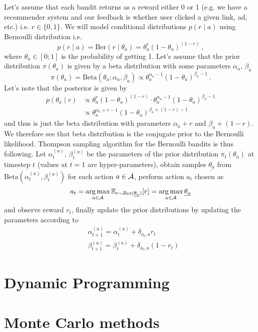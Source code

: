 \documentclass{myclass}
\begin{document}
Let's assume that each bandit returns as a reward either 0 or 1 (e.g. we have a recommender system
and our feedback is whether user clicked a given link, ad, etc.) i.e. $r \in \{0,1\}$. We will model
conditional distributions $p(r \mid a)$ using Bernoulli distribution i.e.
\[
    p(r \mid a) = \text{Ber}(r \mid \theta_a) = \theta_a^r (1 - \theta_a)^{(1-r)}\,,
\]
where $\theta_a \in [0;1]$ is the probability of getting 1. Let's assume that the prior distribution
$\pi(\theta_a)$ is given by a beta distribution with some parameters $\alpha_a$, $\beta_a$
\[
    \pi(\theta_a) = \text{Beta}(\theta_a; \alpha_a, \beta_a) \propto \theta_a^{\alpha_a - 1} (1 - \theta_a)^{\beta_a - 1}\,.
\]
Let's note that the posterior is given by
\[
\begin{split}
    p(\theta_a \mid r) &\propto \theta_a^r (1 - \theta_a)^{(1-r)} \cdot \theta_a^{\alpha_a - 1} (1 - \theta_a)^{\beta_a - 1} \\
                       &\propto \theta_a^{\alpha_a + r - 1} (1 - \theta_a)^{\beta_a + (1 - r) -1}
\end{split}
\]
and thus is just the beta distribution with parameters $\alpha_a + r$ and $\beta_a + (1-r)$. We
therefore see that beta distribution is the conjugate prior to the Bernoulli likelihood. Thompson
sampling algorithm for the Bernoulli bandits is thus following. Let $\alpha_t^{(a)}$,
$\beta_t^{(a)}$ be the parameters of the prior distribution $\pi_t(\theta_a)$ at timestep $t$
(values at $t=1$ are hyper-parameters), obtain samples $\underline{\theta_a}$ from
$\text{Beta}(\alpha_t^{(a)}, \beta_t^{(a)})$ for each action $a \in \mathcal{A}$, perform action $a_t$
chosen as
\[
    a_t = \operatorname*{arg\,max}_{a \in \mathcal{A}} \mathbb{E}_{r \sim \text{Ber}(\underline{\theta_a})}[r] = \operatorname*{arg\,max}_{a \in \mathcal{A}} \underline{\theta_a}
\]
and observe reward $r_t$, finally update the prior distributions by updating the parameters
according to
\[
\begin{split}
    &\alpha_{t+1}^{(a)} = \alpha_{t}^{(a)} + \delta_{a_t,a} r_t\\
    &\beta_{t+1}^{(a)} = \beta_{t}^{(a)} + \delta_{a_t,a} (1 - r_t)
\end{split}
\]

\section{Dynamic Programming}

\section{Monte Carlo methods}
\end{document}
